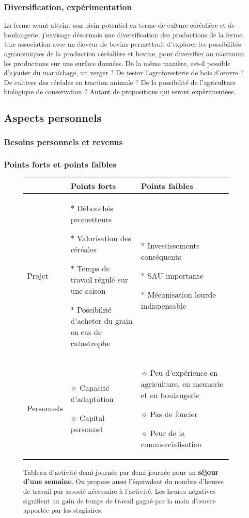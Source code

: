 \documentclass{article}
\begin{document}
\subsubsection*{Diversification, expérimentation}

La ferme ayant atteint son plein potentiel en terme de culture céréalière et de boulangerie, j'envisage désormais une diversification des productions de la ferme. Une association avec un éleveur de bovins permettrait d'explorer les possibilités agronomiques de la production céréalière et bovine, pour diversifier au maximum les productions sur une surface données. De la même manière, est-il possible d'ajouter du maraîchage, un verger ? De tester l'agroforesterie de bois d'œuvre ? De cultiver des céréales en traction animale ? De la possibilité de l'agriculture biologique de conservation ? Autant de propositions qui seront expérimentées.

\subsection{Aspects personnels}

\subsubsection*{Besoins personnels et revenus}

\subsubsection*{Points forts et points faibles}

\begin{figure}[h!]
\begin{center}
\begin{tabular}{|p{2cm}|p{5cm}|p{5cm}|}
\hline
 & Points forts & Points faibles \\
\hline
Projet & 
$\ast$ Débouchés prometteurs

$\ast$ Valorisation des céréales

$\ast$ Temps de travail régulé sur une saison

$\ast$ Possibilité d'acheter du grain en cas de catastrophe
  & 
$\ast$ Investissements conséquents

$\ast$ SAU importante

$\ast$ Mécanisation lourde indispensable
 \\
\hline
Personnels & 
$\diamond$ Capacité d'adaptation

$\diamond$ Capital personnel
& 
$\diamond$ Peu d'expérience en agriculture, en meunerie et en boulangerie

$\diamond$ Pas de foncier

$\diamond$ Peur de la commercialisation
\\
\hline
\end{tabular}
\end{center}
\caption{Tableau d'activité demi-journée par demi-journée pour un \textbf{séjour d'une semaine}. On propose aussi l'équivalent du nombre d'heures de travail par associé nécessaire à l'activité. Les heures négatives signifient un gain de temps de travail gagné par la main d'œuvre apportée par les stagiaires.}
\label{sejour_semaine}
\end{figure}
\end{document}

